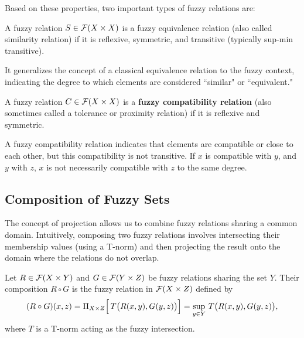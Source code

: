 Based on these properties, two important types of fuzzy relations are:

\begin{definition}
  A fuzzy relation $S \in \mathcal{F}(X \times X)$ is a fuzzy equivalence relation (also called similarity relation) if it is reflexive, symmetric, and transitive (typically sup-min transitive).
\end{definition}
It generalizes the concept of a classical equivalence relation to the fuzzy context, indicating the degree to which elements are considered ``similar" or ``equivalent."

\begin{definition}
  A fuzzy relation $C \in \mathcal{F}(X \times X)$ is a \textbf{fuzzy compatibility relation} (also sometimes called a tolerance or proximity relation) if it is reflexive and symmetric.
\end{definition}
A fuzzy compatibility relation indicates that elements are compatible or close to each other, but this compatibility is not transitive. If $x$ is compatible with $y$, and $y$ with $z$, $x$ is not necessarily compatible with $z$ to the same degree.










\subsection{Composition of Fuzzy Sets}
\label{sec:compos}

The concept of projection allows us to combine fuzzy relations sharing a common domain. Intuitively, composing two fuzzy relations involves intersecting their membership values (using a T-norm) and then projecting the result onto the domain where the relations do not overlap.

\begin{definition}\label{def:compos}
    Let \( R \in \mathcal{F}(X \times Y) \) and \( G \in \mathcal{F}(Y \times Z) \) be fuzzy relations sharing the set \(Y\). Their composition \( R \circ G \) is the fuzzy relation in \(\mathcal{F}(X \times Z)\) defined by
    \[
    (R \circ G)(x,z) = \Pi_{X\times Z}\Bigl[\, T\bigl(R(x,y), G(y,z)\bigr) \Bigr] = \sup_{y\in Y}\, T\bigl(R(x,y), G(y,z)\bigr),
    \]
    where \(T\) is a T-norm acting as the fuzzy intersection.
\end{definition}

